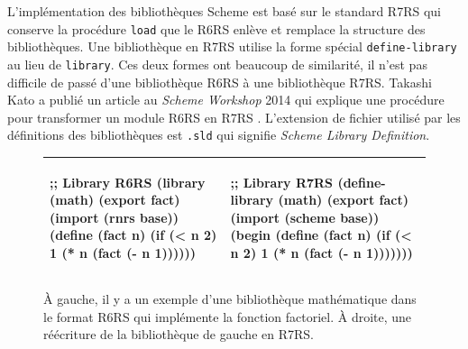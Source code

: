 %

L'implémentation des bibliothèques Scheme est basé sur le standard R7RS qui
conserve la procédure \texttt{load} que le R6RS enlève et remplace la structure
des bibliothèques.  Une bibliothèque en R7RS utilise la forme spécial
\texttt{define-library} au lieu de \texttt{library}. Ces deux formes ont
beaucoup de similarité, il n'est pas difficile de passé d'une bibliothèque R6RS
à une bibliothèque R7RS. Takashi Kato a publié un article au \emph{Scheme
Workshop} 2014 qui explique une procédure pour transformer un module R6RS en
R7RS \cite{SW2014:R6RS/to/R7RS}.  L'extension de fichier utilisé par les
définitions des bibliothèques est \verb|.sld| qui signifie \emph{Scheme Library
Definition}.

\begin{center}
  \begin{figure}[h]
  \begin{tabular}{|l|l|}
    \hline
    \begin{mplisting}{0.5}
;; Library R6RS
(library (math)
  (export fact)
  (import (rnrs base))
  (define (fact n)
    (if (< n 2)
      1
      (* n (fact (- n 1))))))
\end{mplisting} &
    \begin{mplisting}{0.5}
;; Library R7RS
(define-library (math)
  (export fact)
  (import (scheme base))
  (begin
    (define (fact n)
      (if (< n 2)
        1
        (* n (fact (- n 1)))))))
\end{mplisting}\\\hline
  \end{tabular}
\caption{À gauche, il y a un exemple d'une bibliothèque mathématique dans le format R6RS qui implémente
la fonction factoriel. À droite, une réécriture de la bibliothèque de gauche en R7RS.}
  \label{fig:r6rs_r7rs_math_mdoule}
\end{figure}
\end{center}

